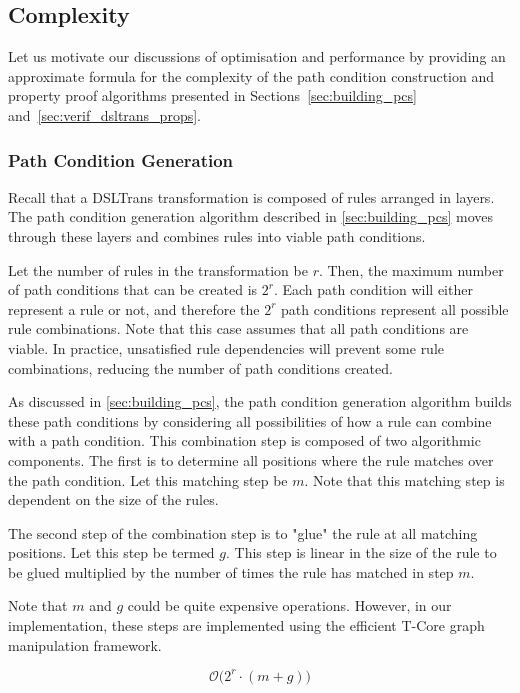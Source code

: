 \subsection{Complexity}
\label{sec:complexity}

Let us motivate our discussions of optimisation and performance by providing an
approximate formula for the complexity of the path condition construction and
property proof algorithms presented in Sections~\ref{sec:building_pcs}
and~\ref{sec:verif_dsltrans_props}.

\subsubsection{Path Condition Generation}
Recall that a DSLTrans transformation is composed of rules arranged in layers.
The path condition generation algorithm described in \cref{sec:building_pcs}
moves through these layers and combines rules into viable path conditions.

Let the number of rules in the transformation be $r$.  Then, the maximum number
of path conditions that can be created is $2^{r}$. Each path condition will
either represent a rule or not, and therefore the $2^{r}$ path conditions
represent all possible rule combinations. Note that this case assumes that all
path conditions are viable. In practice, unsatisfied rule dependencies will
prevent some rule combinations, reducing the number of path conditions created.

As discussed in \cref{sec:building_pcs}, the path condition generation algorithm builds these path conditions by
considering all possibilities of how a rule can combine with a path condition. This
combination step is composed of two algorithmic components. The first is to
determine all positions where the rule matches over the path condition. Let this
matching step be $m$. Note that this matching step is dependent on the size of the rules.

The second step of the combination step is to "glue" the rule at all matching
positions. Let this step be termed $g$. This step is linear in the size of the rule to be glued multiplied by the number of times the rule has matched in step $m$.

Note that $m$ and $g$ could be quite expensive operations. However, in
our implementation, these steps are implemented using the efficient T-Core graph
manipulation framework.

\begin{equation}
\label{eq:complexity}
\mathcal{O}\big({2^r \cdot (m + g)}\big)
\end{equation}

